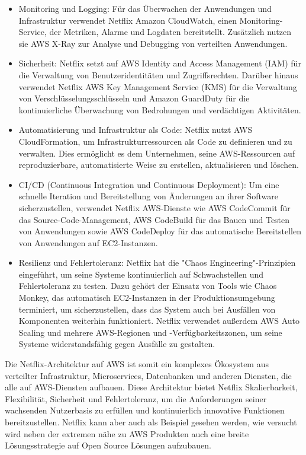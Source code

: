 \begin{itemize}
\item Monitoring und Logging: Für das Überwachen der Anwendungen und Infrastruktur verwendet Netflix Amazon CloudWatch, einen Monitoring-Service, der Metriken, Alarme und Logdaten bereitstellt. Zusätzlich nutzen sie AWS X-Ray zur Analyse und Debugging von verteilten Anwendungen.
\item Sicherheit: Netflix setzt auf AWS Identity and Access Management (IAM) für die Verwaltung von Benutzeridentitäten und Zugriffsrechten. Darüber hinaus verwendet Netflix AWS Key Management Service (KMS) für die Verwaltung von Verschlüsselungsschlüsseln und Amazon GuardDuty für die kontinuierliche Überwachung von Bedrohungen und verdächtigen Aktivitäten.
\item Automatisierung und Infrastruktur als Code: Netflix nutzt AWS CloudFormation, um Infrastrukturressourcen als Code zu definieren und zu verwalten. Dies ermöglicht es dem Unternehmen, seine AWS-Ressourcen auf reproduzierbare, automatisierte Weise zu erstellen, aktualisieren und löschen.
\item CI/CD (Continuous Integration und Continuous Deployment): Um eine schnelle Iteration und Bereitstellung von Änderungen an ihrer Software sicherzustellen, verwendet Netflix AWS-Dienste wie AWS CodeCommit für das Source-Code-Management, AWS CodeBuild für das Bauen und Testen von Anwendungen sowie AWS CodeDeploy für das automatische Bereitstellen von Anwendungen auf EC2-Instanzen.
\item Resilienz und Fehlertoleranz: Netflix hat die "Chaos Engineering"-Prinzipien eingeführt, um seine Systeme kontinuierlich auf Schwachstellen und Fehlertoleranz zu testen. Dazu gehört der Einsatz von Tools wie Chaos Monkey, das automatisch EC2-Instanzen in der Produktionsumgebung terminiert, um sicherzustellen, dass das System auch bei Ausfällen von Komponenten weiterhin funktioniert. Netflix verwendet außerdem AWS Auto Scaling und mehrere AWS-Regionen und -Verfügbarkeitszonen, um seine Systeme widerstandsfähig gegen Ausfälle zu gestalten.
\end{itemize}
Die Netflix-Architektur auf AWS ist somit ein komplexes Ökosystem aus verteilter Infrastruktur, Microservices, Datenbanken und anderen Diensten, die alle auf AWS-Diensten aufbauen. Diese Architektur bietet Netflix Skalierbarkeit, Flexibilität, Sicherheit und Fehlertoleranz, um die Anforderungen seiner wachsenden Nutzerbasis zu erfüllen und kontinuierlich innovative Funktionen bereitzustellen.
Netflix kann aber auch als Beispiel gesehen werden, wie versucht wird neben der extremen nähe zu AWS Produkten auch eine breite Lösungsstrategie auf Open Source Lösungen aufzubauen. 


